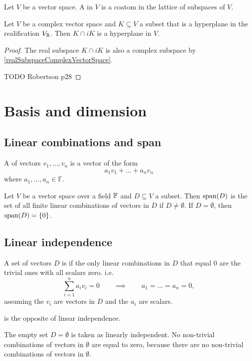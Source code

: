 \begin{definition}
Let $V$ be a vector space. A  in $V$ is a coatom in the lattice of subspaces of $V$.
\end{definition}

\begin{lemma} \label{realComplexHyperplane}
Let $V$ be a complex vector space and $K \subseteq V$ a subset that is a hyperplane in the realification $V_{\mathbb{R}}$. Then $K\cap iK$ is a hyperplane in $V$.
\end{lemma}
\begin{proof}
The real subspace $K\cap iK$ is also a complex subspace by \ref{realSubspaceComplexVectorSpace}.

TODO Robertson p28
\end{proof}

\section{Basis and dimension}
\subsection{Linear combinations and span}
\begin{definition}
A  of vectors $v_1, \ldots, v_n$ is a vector of the form
\[ a_1v_1 + \ldots + a_nv_n \]
where $a_1, \ldots, a_n \in \mathbb{F}$.
\end{definition}

\begin{proposition}
Let $V$ be a vector space over a field $\mathbb{F}$ and $D\subseteq V$ a subset. Then $\operatorname{span}(D)$ is the set of all finite linear combinations of vectors in $D$ if $D \neq \emptyset$. If $D = \emptyset$, then $\operatorname{span}(D) = \{0\}$.
\end{proposition}

\subsection{Linear independence}
\begin{definition}
A set of vectors $D$ is  if the only linear combinations in $D$ that equal $0$ are the trivial ones with all scalars zero. i.e.\,
\[ \sum_{i=1}^n a_iv_i = 0 \qquad\implies\qquad a_1=\ldots=a_n = 0 , \]
assuming the $v_i$ are vectors in $D$ and the $a_i$ are scalars.

 is the opposite of linear independence.
\end{definition}
The empty set $D=\emptyset$ is taken as linearly independent. No non-trivial combinations of vectors in $\emptyset$ are equal to zero, because there are no non-trivial combinations of vectors in $\emptyset$.

